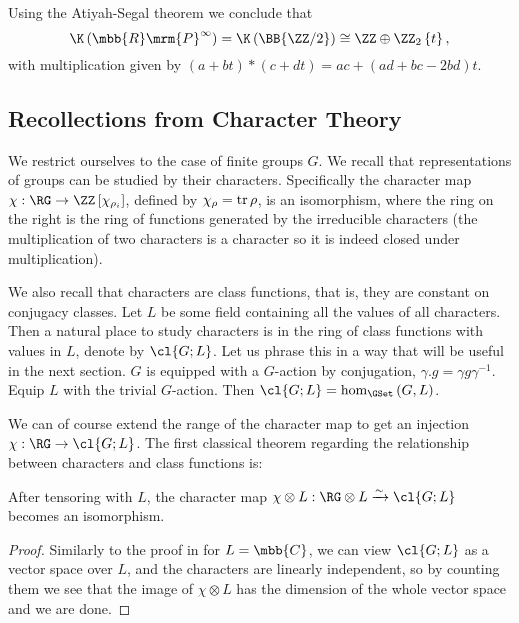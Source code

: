 Using the Atiyah-Segal theorem we conclude that
$$
\K\left({\mbb{R}\mrm{P}}^\infty\right)
= \K\left(\BB{\ZZ/2}\right)
\cong \ZZ \oplus \ZZ_2\left\{t\right\},
$$
with multiplication given by $\left(a+bt\right) * \left(c+dt\right) = ac + (ad+bc-2bd)t$.




\subsection{Recollections from Character Theory}

We restrict ourselves to the case of finite groups $G$.
We recall that representations of groups can be studied by their characters.
Specifically the character map $\chi: \RG \to \ZZ\left[\chi_{\rho_i}\right]$, defined by $\chi_\rho = \operatorname{tr} \rho$, is an isomorphism, where the ring on the right is the ring of functions generated by the irreducible characters (the multiplication of two characters is a character so it is indeed closed under multiplication).

We also recall that characters are class functions, that is, they are constant on conjugacy classes.
Let $L$ be some field containing all the values of all characters.
Then a natural place to study characters is in the ring of class functions with values in $L$, denote by $\cl{G;L}$.
Let us phrase this in a way that will be useful in the next section.
$G$ is equipped with a $G$-action by conjugation, $\gamma.g = \gamma g \gamma^{-1}$.
Equip $L$ with the trivial $G$-action.
Then $\cl{G;L} = \hom_{\GSet}\left(G, L\right)$.

We can of course extend the range of the character map to get an injection $\chi: \RG \to \cl{G;L}$.
The first classical theorem regarding the relationship between characters and class functions is:

\begin{theorem}\label{char-1}
	After tensoring with $L$, the character map $\chi \otimes L: \RG \otimes L \xrightarrow{\sim} \cl{G; L}$ becomes an isomorphism.
\end{theorem}

\begin{proof}
	Similarly to the proof in \cite[9.1]{Ser} for $L = \mbb{C}$, we can view $\cl{G;L}$ as a vector space over $L$, and the characters are linearly independent, so by counting them we see that the image of $\chi \otimes L$ has the dimension of the whole vector space and we are done.
\end{proof}

